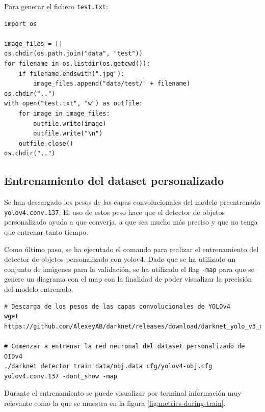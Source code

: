 Para generar el fichero \texttt{test.txt}:

\vspace{0.5cm}
\begin{lstlisting}[language=iPython,caption=Generación del fichero test.txt,captionpos=b,label={lst:test-generate}]
import os

image_files = []
os.chdir(os.path.join("data", "test"))
for filename in os.listdir(os.getcwd()):
    if filename.endswith(".jpg"):
        image_files.append("data/test/" + filename)
os.chdir("..")
with open("test.txt", "w") as outfile:
    for image in image_files:
        outfile.write(image)
        outfile.write("\n")
    outfile.close()
os.chdir("..")
\end{lstlisting}

\subsection{Entrenamiento del dataset personalizado}
\label{subsec:training-custom-dataset}

Se han descargado los pesos de las capas convolucionales del modelo preentrenado \texttt{yolov4.conv.137}. El uso de estos peso hace que el detector de objetos personalizado ayuda a que converja, a que sea mucho más preciso y que no tenga que entrenar tanto tiempo.

Como último paso, se ha ejecutado el comando para realizar el entrenamiento del detector de objetos personalizado con \gls{yolov4}. Dado que se ha utilizado un conjunto de imágenes para la validación, se ha utilizado el flag \texttt{-map} para que se genere un diagrama con el \gls{map} con la finalidad de poder visualizar la precisión del modelo entrenado.

\vspace{0.5cm}
\begin{lstlisting}[language=iPython,caption=Entrenamiento del dataset personalizado,captionpos=b,label={lst:training-custom-dataset}]
# Descarga de los pesos de las capas convolucionales de YOLOv4
wget https://github.com/AlexeyAB/darknet/releases/download/darknet_yolo_v3_optimal/yolov4.conv.137

# Comenzar a entrenar la red neuronal del dataset personalizado de OIDv4
./darknet detector train data/obj.data cfg/yolov4-obj.cfg yolov4.conv.137 -dont_show -map
\end{lstlisting}

Durante el entrenamiento se puede visualizar por terminal información muy relevante como la que se muestra en la figura \ref{fig:metrics-during-train}.

